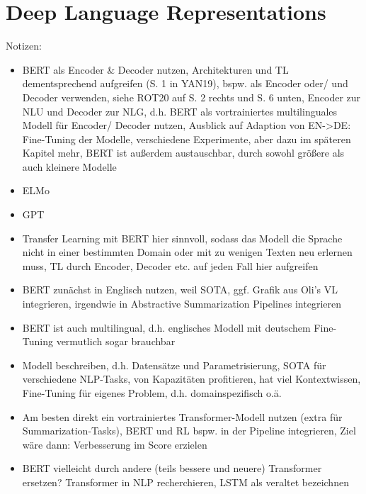 \section{Deep Language Representations}
Notizen:
\begin{itemize}
	\item BERT als Encoder & Decoder nutzen, Architekturen und TL dementsprechend aufgreifen (S. 1 in YAN19), bspw. als Encoder oder/ und Decoder verwenden, siehe ROT20 auf S. 2 rechts und S. 6 unten, Encoder zur NLU und Decoder zur NLG, d.h. BERT als vortrainiertes multilinguales Modell für Encoder/ Decoder nutzen, Ausblick auf Adaption von EN->DE: Fine-Tuning der Modelle, verschiedene Experimente, aber dazu im späteren Kapitel mehr, BERT ist außerdem austauschbar, durch sowohl größere als auch kleinere Modelle
	\item ELMo
	\item GPT
	\item Transfer Learning mit BERT hier sinnvoll, sodass das Modell die Sprache nicht in einer bestimmten Domain oder mit zu wenigen Texten neu erlernen muss, TL durch Encoder, Decoder etc. auf jeden Fall hier aufgreifen
	\item BERT zunächst in Englisch nutzen, weil SOTA, ggf. Grafik aus Oli's VL integrieren, irgendwie in Abstractive Summarization Pipelines integrieren
	\item BERT ist auch multilingual, d.h. englisches Modell mit deutschem Fine-Tuning vermutlich sogar brauchbar
	\item Modell beschreiben, d.h. Datensätze und Parametrisierung, SOTA für verschiedene NLP-Tasks, von Kapazitäten profitieren, hat viel Kontextwissen, Fine-Tuning für eigenes Problem, d.h. domainspezifisch o.ä.
	\item Am besten direkt ein vortrainiertes Transformer-Modell nutzen (extra für Summarization-Tasks), BERT und RL bspw. in der Pipeline integrieren, Ziel wäre dann: Verbesserung im Score erzielen
	\item BERT vielleicht durch andere (teils bessere und neuere) Transformer ersetzen? Transformer in NLP recherchieren, LSTM als veraltet bezeichnen
\end{itemize}
